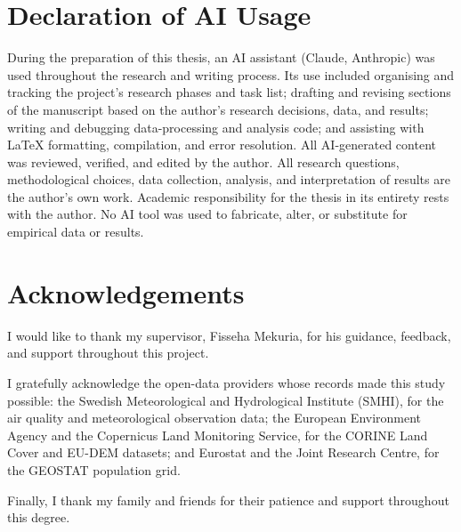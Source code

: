 \documentclass[11pt,a4paper]{article}
\let\oldsection\section
\renewcommand{\section}{\FloatBarrier\oldsection}
\begin{document}
\section*{Declaration of AI Usage}

During the preparation of this thesis, an AI assistant (Claude, Anthropic) was used throughout the research and writing process. Its use included organising and tracking the project's research phases and task list; drafting and revising sections of the manuscript based on the author's research decisions, data, and results; writing and debugging data-processing and analysis code; and assisting with LaTeX formatting, compilation, and error resolution. All AI-generated content was reviewed, verified, and edited by the author. All research questions, methodological choices, data collection, analysis, and interpretation of results are the author's own work. Academic responsibility for the thesis in its entirety rests with the author. No AI tool was used to fabricate, alter, or substitute for empirical data or results.

\clearpage

\section*{Acknowledgements}

I would like to thank my supervisor, Fisseha Mekuria, for his guidance, feedback, and support throughout this project.

I gratefully acknowledge the open-data providers whose records made this study possible: the Swedish Meteorological and Hydrological Institute (SMHI), for the air quality and meteorological observation data; the European Environment Agency and the Copernicus Land Monitoring Service, for the CORINE Land Cover and EU-DEM datasets; and Eurostat and the Joint Research Centre, for the GEOSTAT population grid.

Finally, I thank my family and friends for their patience and support throughout this degree.

\clearpage

\tableofcontents
\clearpage
\end{document}
